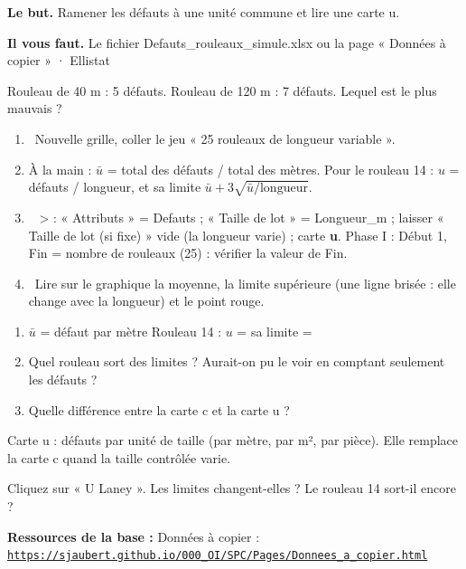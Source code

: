 \documentclass[10pt,a4paper]{article}
\begin{document}
\thispagestyle{fancy}
\begin{tcolorbox}[boite]\textbf{Le but.} Ramener les défauts à une unité commune et lire une carte u.\par\textbf{Il vous faut.} Le fichier Defauts\_rouleaux\_simule.xlsx ou la page « Données à copier » · Ellistat\end{tcolorbox}
\begin{tcolorbox}[pred]Rouleau de 40 m : 5 défauts. Rouleau de 120 m : 7 défauts. Lequel est le plus mauvais ?\reponse\end{tcolorbox}
\begin{enumerate}[label=\textcolor{cyan}{\textbf{\arabic*.}},leftmargin=15pt,itemsep=1.5pt]
\item \tagE\ Nouvelle grille, coller le jeu « 25 rouleaux de longueur variable ».
\item À la main : $\bar u$ = total des défauts / total des mètres. Pour le rouleau 14 : $u$ = défauts / longueur, et sa limite $\bar u + 3\sqrt{\bar u / \text{longueur}}$.
\item \tagE\  >  : « Attributs » = Defauts ; « Taille de lot » = Longueur\_m ; laisser « Taille de lot (si fixe) » vide (la longueur varie) ; carte \textbf{u}. Phase I : Début 1, Fin = nombre de rouleaux (25) : vérifier la valeur de Fin.
\item \tagE\ Lire sur le graphique la moyenne, la limite supérieure (une ligne brisée : elle change avec la longueur) et le point rouge.
\end{enumerate}
\begin{enumerate}[label=\textcolor{cyan}{\textbf{Q\arabic*.}},leftmargin=22pt]
\item $\bar u$ = \champ{16mm} défaut par mètre \quad Rouleau 14 : $u$ = \champ{16mm} \quad sa limite = \champ{16mm}\par\vspace{5pt}
\item Quel rouleau sort des limites ? Aurait-on pu le voir en comptant seulement les défauts ?\reponse[2]
\item Quelle différence entre la carte c et la carte u ?\reponse[1]
\end{enumerate}
\begin{tcolorbox}[retenir]Carte u : défauts par unité de taille (par mètre, par m², par pièce). Elle remplace la carte c quand la taille contrôlée varie.\end{tcolorbox}
\begin{tcolorbox}[plus]Cliquez sur « U Laney ». Les limites changent-elles ? Le rouleau 14 sort-il encore ?\end{tcolorbox}
\vfill{\footnotesize\color{uimm}\textbf{Ressources de la base :} Données à copier : \href{https://sjaubert.github.io/000_OI/SPC/Pages/Donnees_a_copier.html\#rouleaux}{\nolinkurl{https://sjaubert.github.io/000_OI/SPC/Pages/Donnees_a_copier.html}}}
\end{document}
